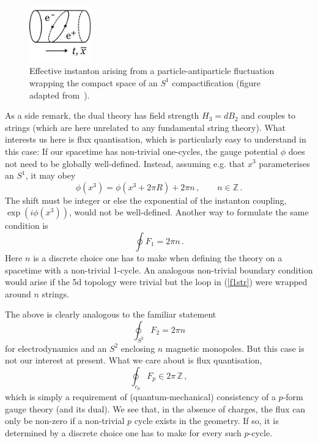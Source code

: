 \documentclass[12pt]{article}
\newcommand{\be}{\begin{equation}}
\newcommand{\ee}{\end{equation}}
\numberwithin{equation}{section}
\begin{document}
\begin{figure}[ht]
\begin{center} 
\includegraphics[width=2.7cm]{strins.png}
\caption{Effective instanton arising from a particle-antiparticle fluctuation 
wrapping the compact space of an $S^1$ compactification (figure adapted from~\cite{Hebecker:2018ofv}).}
\label{strins} 
\end{center}
\end{figure}

As a side remark, the dual theory has field strength $H_3=dB_2$ and couples to strings (which are here unrelated to any fundamental string theory). What interests us here is flux quantisation, which is particularly easy to understand in this case: If our spacetime has non-trivial one-cycles, the gauge potential $\phi$ does not need to be globally well-defined. Instead, assuming e.g. that $x^3$ parameterises an $S^1$, it may obey 
\be
\phi(x^3)=\phi(x^3+2\pi R)+2\pi n\,,\qquad n\in \mathbb{Z}\,.\label{flc}
\ee
The shift must be integer or else the exponential of the instanton coupling, $\exp(i\phi(x^3))$, would not be well-defined. Another way to formulate the same condition is
\be
\oint F_1=2\pi n\,.\label{f1str}
\ee
Here $n$ is a discrete choice one has to make when defining the theory on a spacetime with a non-trivial 1-cycle. An analogous non-trivial boundary condition would arise if the 5d topology were trivial but the loop in (\ref{f1str}) were wrapped around $n$ strings.

The above is clearly analogous to the familiar statement
\be
\oint_{S^2} F_2=2\pi n \label{f2n}
\ee
for electrodynamics and an $S^2$ enclosing $n$ magnetic monopoles. But this case is not our interest at present. What we care about is flux quantisation,
\be
\oint_{c_p}F_p\in 2\pi \,\mathbb{Z}\,,
\ee
which is simply a requirement of (quantum-mechanical) consistency of a $p$-form gauge theory (and its dual). We see that, in the absence of charges, the flux can only be non-zero if a non-trivial $p$ cycle exists in the geometry. If so, it is determined by a discrete choice one has to make for every such $p$-cycle.
\end{document}
